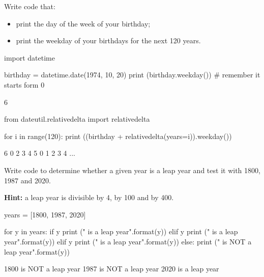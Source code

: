 \begin{question}
\label{ex:dateex}
Write code that:

\begin{itemize}
\item print the day of the week of your birthday;
\item print the weekday of your birthdays for the next 120 years.
\end{itemize}
\end{question}

\cprotEnv\begin{solution}
\begin{ipython}
import datetime

birthday = datetime.date(1974, 10, 20)
print (birthday.weekday()) # remember it starts form 0
\end{ipython}
\begin{ioutput}
6
\end{ioutput}
\begin{ipython}
from dateutil.relativedelta import relativedelta

for i in range(120):
    print ((birthday + relativedelta(years=i)).weekday())
\end{ipython}
\begin{ioutput}
6
0
2
3
4
5
0
1
2
3
4
...
\end{ioutput}
\end{solution}

\begin{question}
Write code to determine whether a given year is a leap year and test it with 1800, 1987 and 2020.

\noindent\textbf{Hint:} a leap year is divisible by 4, by 100 and by 400.
\end{question}

\cprotEnv\begin{solution}
\begin{ipython}
years = [1800, 1987, 2020]

for y in years:
    if y %
        print ("{} is a leap year".format(y))
	elif y %
        print ("{} is a leap year".format(y)) 
    elif y %
        print ("{} is a leap year".format(y))
    else:
        print ("{} is NOT a leap year".format(y))
\end{ipython}
\begin{ioutput}
1800 is NOT a leap year
1987 is NOT a leap year
2020 is a leap year        
\end{ioutput}  
\end{solution}


